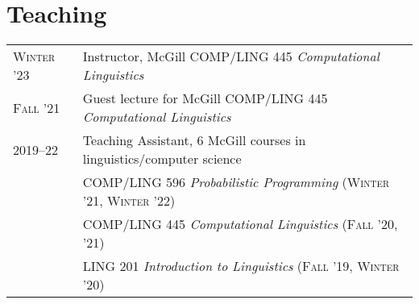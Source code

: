 \documentclass[11pt,a4paper]{article}
\begin{document}
  \section{Teaching}
  \begin{longtable}{p{1.7cm}|p{15cm}}
    \textsc{Winter '23}%
      & Instructor, McGill COMP/LING 445 \emph{Computational Linguistics}\\
    \textsc{Fall '21}%
      & Guest lecture for McGill COMP/LING 445 \emph{Computational Linguistics}\\
    \textsc{2019--22}%
      & Teaching Assistant, 6 McGill courses in linguistics/computer science\\
      &\quad{}COMP/LING 596 \emph{Probabilistic Programming}
            (\textsc{Winter '21, Winter '22})\\
      &\quad{}COMP/LING 445 \emph{Computational Linguistics}
            (\textsc{Fall '20, '21})\\
      &\quad{}LING 201 \emph{Introduction to Linguistics}
            (\textsc{Fall '19}, \textsc{Winter '20})\\
  \end{longtable}
\end{document}
